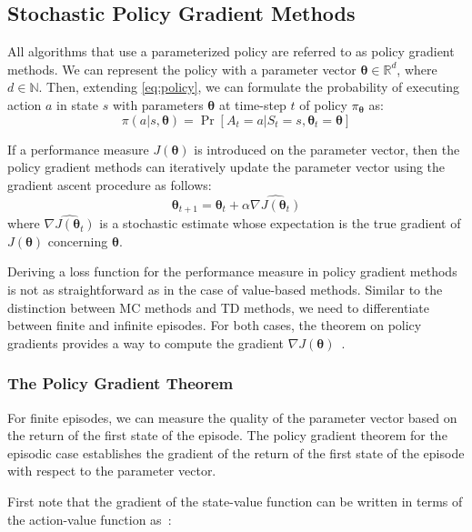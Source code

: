 \documentclass[../xlapes02]{subfiles}
\begin{document}
    \subsection{Stochastic Policy Gradient Methods}\label{subsec:policy-gradient}
    All algorithms that use a parameterized policy are referred to as policy gradient methods. We can represent the policy with a parameter vector $ \bm{\theta} \in \mathbb{R}^d $, where $ d \in \mathbb{N} $. Then, extending \cref{eq:policy}, we can formulate the probability of executing action $ a $ in state $ s $ with parameters $ \bm{\theta} $ at time-step $ t $ of policy $ \pi_{\bm{\theta}} $ as:
    \begin{equation}
        \pi(a|s,\bm{\theta})=\Pr\left[A_t=a|S_t=s,\bm{\theta}_t=\bm{\theta}\right]
    \end{equation}

    If a performance measure $ J(\bm{\theta}) $ is introduced on the parameter vector, then the policy gradient methods can iteratively update the parameter vector using the gradient ascent procedure as follows:
    \begin{equation}
        \bm{\theta}_{t+1}=\bm{\theta}_t+\alpha\widehat{\nabla J(\bm{\theta}_t)}
    \end{equation}
    where $\widehat{\nabla J(\bm{\theta}_t)}$ is a stochastic estimate whose expectation is the true gradient of $ J(\bm{\theta}) $ concerning $ \bm{\theta} $.

    Deriving a loss function for the performance measure in policy gradient methods is not as straightforward as in the case of value-based methods. Similar to the distinction between MC methods and TD methods, we need to differentiate between finite and infinite episodes. For both cases, the theorem on policy gradients provides a way to compute the gradient $ \nabla J(\bm{\theta}) $~\cite{sutton2018reinforcement, FITMT25127}.

    \subsubsection{The Policy Gradient Theorem}\label{subsubsec:policy-gradient-theorem}
    For finite episodes, we can measure the quality of the parameter vector based on the return of the first state of the episode. The policy gradient theorem for the episodic case establishes the gradient of the return of the first state of the episode with respect to the parameter vector.

    First note that the gradient of the state-value function can be
    written in terms of the action-value function as~\cite{sutton2018reinforcement}:
\end{document}
